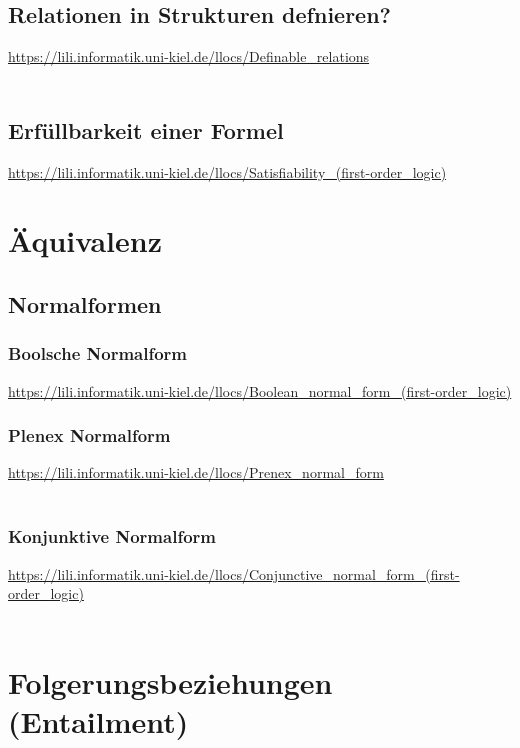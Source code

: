 \documentclass{article}
\begin{document}
    \subsection{Relationen in Strukturen defnieren?}
    \url{https://lili.informatik.uni-kiel.de/llocs/Definable_relations}\\\\

    \subsection{Erfüllbarkeit einer Formel}
    \url{https://lili.informatik.uni-kiel.de/llocs/Satisfiability_(first-order_logic)}\\

    \section{Äquivalenz}

    \subsection{Normalformen}

    \subsubsection{Boolsche Normalform}
    \url{https://lili.informatik.uni-kiel.de/llocs/Boolean_normal_form_(first-order_logic)}\\

    \subsubsection{Plenex Normalform}
    \url{https://lili.informatik.uni-kiel.de/llocs/Prenex_normal_form}\\\\

    \subsubsection{Konjunktive Normalform}
    \url{https://lili.informatik.uni-kiel.de/llocs/Conjunctive_normal_form_(first-order_logic)}\\\\

    \section{Folgerungsbeziehungen (Entailment)}
\end{document}
